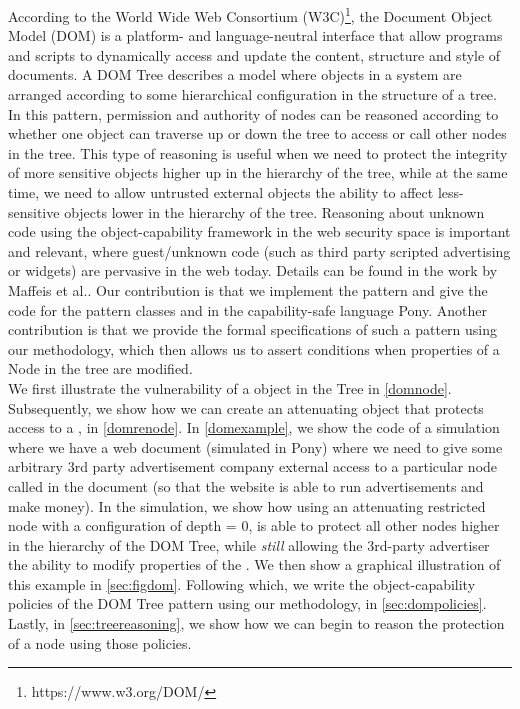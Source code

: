 \documentclass[a4paper,11pt,twoside]{article}
\begin{document}
According to the World Wide Web Consortium (W3C)\footnote{https://www.w3.org/DOM/}, the Document Object Model (DOM) is a platform- and language-neutral interface that allow programs and scripts to dynamically access and update the content, structure and style of documents. A DOM Tree describes a model where objects in a system are arranged according to some hierarchical configuration in the structure of a tree. In this pattern, permission and authority of nodes can be reasoned according to whether one object can traverse up or down the tree to access or call other nodes in the tree. This type of reasoning is useful when we need to protect the integrity of more sensitive objects higher up in the hierarchy of the tree, while at the same time, we need to allow untrusted external objects the ability to affect less-sensitive objects lower in the hierarchy of the tree. Reasoning about unknown code using the object-capability framework in the web security space is important and relevant, where guest/unknown code (such as third party scripted advertising or widgets) are pervasive in the web today. Details can be found in the work by Maffeis et al.\cite{maffeis2010}. Our contribution is that we implement the pattern and give the code for the pattern classes  and  in the capability-safe language Pony. Another contribution is that we provide the formal specifications of such a pattern using our methodology, which then allows us to assert conditions when properties of a Node in the tree are modified. \\


We first illustrate the vulnerability of a  object in the Tree in \cref{domnode}. Subsequently, we show how we can create an attenuating object  that protects access to a , in \cref{domrenode}. In \cref{domexample}, we show the code of a simulation where we have a web document (simulated in Pony) where we need to give some arbitrary 3rd party advertisement company external access to a particular node called  in the document (so that the website is able to run advertisements and make money). In the simulation, we show how using an attenuating restricted node  with a configuration of depth = 0, is able to protect all other nodes higher in the hierarchy of the DOM Tree, while \textit{still} allowing the 3rd-party advertiser the ability to modify properties of the . We then show a graphical illustration of this example in \cref{sec:figdom}. Following which, we write the object-capability policies of the DOM Tree pattern using our methodology, in \cref{sec:dompolicies}. Lastly, in \cref{sec:treereasoning}, we show how we can begin to reason the protection of a node using those policies.
\end{document}
